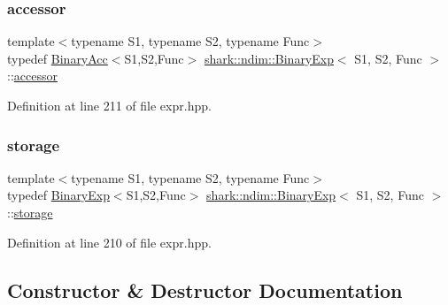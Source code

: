 \subsubsection{\texorpdfstring{accessor}{accessor}}
{\footnotesize\ttfamily template$<$typename S1, typename S2, typename Func$>$ \\
typedef \hyperlink{classshark_1_1ndim_1_1_binary_acc}{Binary\+Acc}$<$S1,S2,Func$>$ \hyperlink{classshark_1_1ndim_1_1_binary_exp}{shark\+::ndim\+::\+Binary\+Exp}$<$ S1, S2, Func $>$\+::\hyperlink{classshark_1_1ndim_1_1_binary_exp_a50255b11a4422c310fb6042fbc5bd306}{accessor}}



Definition at line 211 of file expr.\+hpp.

\hypertarget{classshark_1_1ndim_1_1_binary_exp_a4bab60eae0f72585742abcc3b988fa5b}{}\label{classshark_1_1ndim_1_1_binary_exp_a4bab60eae0f72585742abcc3b988fa5b} 
\subsubsection{\texorpdfstring{storage}{storage}}
{\footnotesize\ttfamily template$<$typename S1, typename S2, typename Func$>$ \\
typedef \hyperlink{classshark_1_1ndim_1_1_binary_exp}{Binary\+Exp}$<$S1,S2,Func$>$ \hyperlink{classshark_1_1ndim_1_1_binary_exp}{shark\+::ndim\+::\+Binary\+Exp}$<$ S1, S2, Func $>$\+::\hyperlink{classshark_1_1ndim_1_1_binary_exp_a4bab60eae0f72585742abcc3b988fa5b}{storage}}



Definition at line 210 of file expr.\+hpp.



\subsection{Constructor \& Destructor Documentation}
\hypertarget{classshark_1_1ndim_1_1_binary_exp_a01a64057abf9d21a81f3718ce94adf7b}{}\label{classshark_1_1ndim_1_1_binary_exp_a01a64057abf9d21a81f3718ce94adf7b} 
